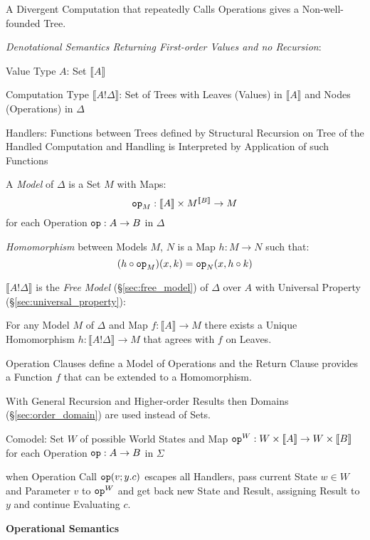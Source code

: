 A Divergent Computation that repeatedly Calls Operations gives a
Non-well-founded Tree. \cite{pretnar15}


\emph{Denotational Semantics Returning First-order Values and no
  Recursion}:

Value Type $A$: Set $\llbracket A \rrbracket$

Computation Type $\llbracket A!\Delta \rrbracket$: Set of Trees with
Leaves (Values) in $\llbracket A \rrbracket$ and Nodes (Operations) in
$\Delta$

Handlers: Functions between Trees defined by Structural Recursion on
Tree of the Handled Computation and Handling is Interpreted by
Application of such Functions

A \emph{Model} of $\Delta$ is a Set $M$ with Maps:
\[
  \mathtt{op}_M : \llbracket A \rrbracket
    \times M^{\llbracket B \rrbracket} \rightarrow M
\]
for each Operation $\mathtt{op} : A \rightarrow B$ in $\Delta$

\emph{Homomorphism} between Models $M$, $N$ is a Map $h : M
\rightarrow N$ such that:
\[
  (h \circ \mathtt{op}_M)(x,k) = \mathtt{op}_N(x,h \circ k)
\]

$\llbracket A ! \Delta \rrbracket$ is the \emph{Free Model}
(\S\ref{sec:free_model}) of $\Delta$ over $A$ with Universal Property
(\S\ref{sec:universal_property}):

For any Model $M$ of $\Delta$ and Map $f : \llbracket A \rrbracket
\rightarrow M$ there exists a Unique Homomorphism $h : \llbracket A !
\Delta \rrbracket \rightarrow M$ that agrees with $f$ on Leaves.
\cite{pretnar15}

Operation Clauses define a Model of Operations and the Return Clause
provides a Function $f$ that can be extended to a Homomorphism.
\cite{pretnar15}

\fist With General Recursion and Higher-order Results then
Domains (\S\ref{sec:order_domain}) are used instead of Sets.

Comodel: Set $W$ of possible World States and Map $\mathtt{op}^W : W
\times \llbracket A \rrbracket \rightarrow W \times \llbracket B
\rrbracket$ for each Operation $\mathtt{op} : A \rightarrow B$ in
$\Sigma$

when Operation Call $\mathtt{op}(v; y.c)$ escapes all Handlers, pass
current State $w \in W$ and Parameter $v$ to $\mathtt{op}^W$ and get
back new State and Result, assigning Result to $y$ and continue
Evaluating $c$. \cite{pretnar15}


\textbf{Operational Semantics} \cite{pretnar15}

